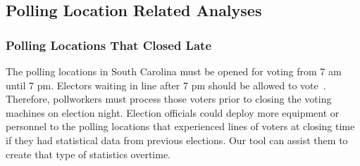 \subsection{Polling Location Related Analyses}
\subsubsection{Polling Locations That Closed Late}
The polling locations in South Carolina must be opened for voting from 7 am until 7 pm. Electors waiting in line after 7 pm should be allowed to vote~\cite{VotingInfo}. Therefore, pollworkers must process those voters prior to closing the voting machines on election night. Election officials could deploy more equipment or personnel to the polling locations that experienced lines of voters at closing time if they had statistical data from previous elections. Our tool can assist them to create that type of statistics overtime.

